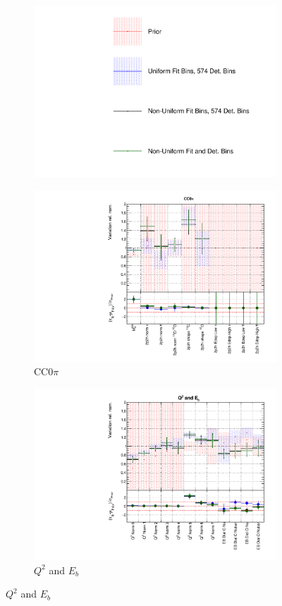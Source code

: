 \begin{figure}
\centering
\begin{subfigure}{0.95\textwidth}
  \centering
  \includegraphics[width=0.29\linewidth]{figs/polydata_leg}
\end{subfigure}
\begin{subfigure}{0.49\textwidth}
  \centering
  \includegraphics[width=0.9\linewidth]{figs/polydataxsec_1}
  \caption{CC0$\pi$}
\end{subfigure}
\begin{subfigure}{0.49\textwidth}
  \centering
  \includegraphics[width=0.9\linewidth]{figs/polydataxsec_2}
  \caption{$Q^2$ and $E_b$}
\end{subfigure}

\end{figure}
